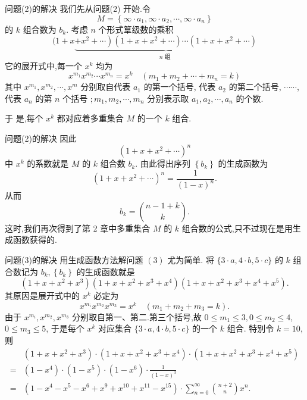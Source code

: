 \documentclass[punct]{ctexbeamer}
\begin{document}
\begin{frame}{问题(2)的解决}
	我们先从问题(2) 开始.令
	$$
	M=\left\{\infty \cdot a_{1}, \infty \cdot a_{2}, \cdots, \infty \cdot a_{n}\right\}
	$$
	的 $k$ 组合数为 $b_{k}$. 考虑 $n$ 个形式筸级数的乘积
	$$
	(1+x \underbrace{\left.+x^{2}+\cdots\right)\left(1+x+x^{2}+\cdots\right) \cdots\left(1+x+x^{2}+\cdots\right)}_{n \text { 组 }}
	$$
	它的展开式中,每一个 $x^{k}$ 均为
	$$
	x^{m_{1}} x^{m_{2}} \cdots x^{m_{n}}=x^{k} \quad\left(m_{1}+m_{2}+\cdots+m_{n}=k\right)
	$$
	其中 $x^{m_{1}}, x^{m_{2}}, \cdots, x^{m}$ 分别取自代表 $a_{1}$ 的第一个括号, 代表 $a_{2}$ 的第二个括号, $\cdots \cdots$, 代表 $a_{n}$ 的第 $n$ 个括号 $; m_{1}, m_{2}, \cdots, m_{n}$ 分别表示取 $a_{1}, a_{2}, \cdots, a_{n}$ 的个数.

     于 是,每个 $x^{k}$ 都对应着多重集合 $M$ 的一个 $k$ 组合.
\end{frame}

\begin{frame}{问题(2)的解决}
	 因此
	$$
	\left(1+x+x^{2}+\cdots\right)^{n}
	$$
	中 $x^{k}$ 的系数就是 $M$ 的 $k$ 组合数 $b_{k}$. 由此得出序列 $\left\{b_{k}\right\}$ 的生成函数为
	$$
	\left(1+x+x^{2}+\cdots\right)^{n}=\frac{1}{(1-x)^{n}}.
	$$从而
	$$
	b_{k}=\binom{n-1+k}{k}.
	$$
	这时,我们再次得到了第 2 章中多重集合 $M$ 的 $k$ 组合数的公式,只不过现在是用生成函数获得的.

\end{frame}

\begin{frame}{问题(3)的解决}
	用生成函数方法解问题 $(3)$ 尤为简单. 将 $\{3 \cdot a, 4 \cdot b, 5 \cdot c\}$ 的 $k$ 组合数记为 $b_{k},\left\{b_{k}\right\}$ 的生成函数就是
	$$
	\left(1+x+x^{2}+x^{3}\right)\left(1+x+x^{2}+x^{3}+x^{4}\right)\left(1+x+x^{2}+x^{3}+x^{4}+x^{5}\right).
	$$
	其原因是展开式中的 $x^{k}$ 必定为
	$$
	x^{m_{i}} x^{m_{2}} x^{m_{3}}=x^{k} \quad\left(m_{1}+m_{2}+m_{3}=k\right).
	$$
	由于 $x^{m_{i}}, x^{m_{2}}, x^{m_{3}}$ 分别取自第一、第二.第三个括号,故 $0 \leqslant m_{1} \leqslant 3,0 \leqslant m_{2} \leqslant 4$, $0 \leqslant m_{3} \leqslant 5$, 于是每个 $x^{k}$ 对应集合 $\{3 \cdot a, 4 \cdot b, 5 \cdot c\}$ 的一个 $k$ 组合.
	特别令 $k=10$,则
	$$
	\begin{aligned}
	&\left(1+x+x^{2}+x^{3}\right) \cdot\left(1+x+x^{2}+x^{3}+x^{4}\right) \cdot\left(1+x+x^{2}+x^{3}+x^{4}+x^{5}\right) \\
	=&\left(1-x^{4}\right) \cdot\left(1-x^{5}\right) \cdot\left(1-x^{6}\right) \cdot \frac{1}{(1-x)^{3}} \\
	=&\left(1-x^{4}-x^{5}-x^{6}+x^{9}+x^{10}+x^{11}-x^{15}\right) \cdot \sum_{n=0}^{\infty}\binom{n+2}{n}x^{n}.
	\end{aligned}
	$$
\end{frame}
\end{document}
